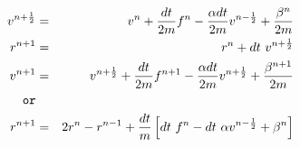 \documentclass[24pt]{article}
\newcommand{\myhalf}{\frac{1}{2}}
\begin{document}
\begin{eqnarray*}
v^{n+\myhalf}  &=& v^n + \frac{dt}{2m} f^n -  \frac{\alpha dt}{2m} v^{n-\myhalf} + \frac{\beta^n}{2m} \\
r^{n+1}  &=& r^n + dt~v^{n+\myhalf}  \\
v^{n+1}  &=& v^{n+\myhalf} + \frac{dt}{2m} f^{n+1} -  \frac{\alpha dt}{2m} v^{n+\myhalf} + \frac{\beta^{n+1}}{2m} \\
{\tt or} \\
r^{n+1}  &=& 2r^n - r^{n-1} + \frac{dt}{m} \left [ dt~f^n -  dt~\alpha v^{n-\myhalf} + \beta^n \right ] \\
\end{eqnarray*}
\end{document}
